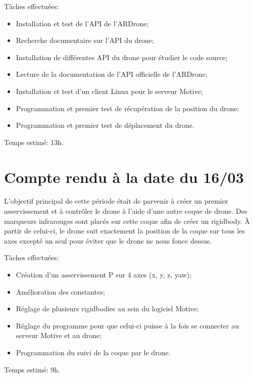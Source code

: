 		Tâches effectuées:
		\begin{itemize}
			\item Installation et test de l'API de l'ARDrone;
			\item Recherche documentaire sur l'API du drone;
			\item Installation de différentes API du drone pour étudier le code source;
			\item Lecture de la documentation de l'API officielle de l'ARDrone;
			\item Installation et test d'un client Linux pour le serveur Motive;
			\item Programmation et premier test de récupération de la position du drone;
			\item Programmation et premier test de déplacement du drone. \\
		\end{itemize}

		Temps estimé: 13h.


	\section{Compte rendu à la date du 16/03}
		L'objectif principal de cette période était de parvenir à créer un premier asservissement et à contrôler le drone à l'aide d'une autre coque de drone. Des marqueurs infrarouges sont placés sur cette coque afin de créer un rigidbody. À partir de celui-ci, le drone suit exactement la position de la coque sur tous les axes excepté un seul pour éviter que le drone ne nous fonce dessus.

		Tâches effectuées:
		\begin{itemize}
			\item Création d'un asservissement P sur 4 axes (x, y, z, yaw);
			\item Amélioration des constantes;
			\item Réglage de plusieurs rigidbodies au sein du logiciel Motive;
			\item Réglage du programme pour que celui-ci puisse à la fois se connecter au serveur Motive et au drone;
			\item Programmation du suivi de la coque par le drone. \\
		\end{itemize}

		Temps estimé: 9h.


